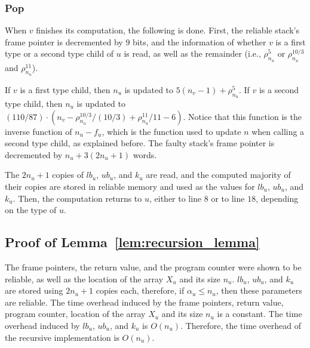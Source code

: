 \documentclass{llncs}
\begin{document}
\subsubsection{Pop}

When $v$ finishes its computation, the following is done. First, the reliable stack's frame pointer is decremented by $9$ bits, and the information of whether $v$ is a first type or a second type child of $u$ is read, as well as the remainder (i.e., $\rho^5_{n_u}$ or $\rho^{10/3}_{n_u}$ and $\rho^{11}_{n_u}$).

If $v$ is a first type child, then $n_u$ is updated to $5(n_v - 1) + \rho^5_{n_u}$. If $v$ is a second type child, then $n_u$ is updated to $(110/87) \cdot (n_v - \rho^{10/3}_{n_u}/(10/3) + \rho^{11}_{n_u} / 11 - 6)$. Notice that this function is the inverse function of $n_u - f_u$, which is the function used to update $n$ when calling a second type child, as explained before. The faulty stack's frame pointer is decremented by $n_u + 3(2n_u + 1)$ words.

The $2n_u + 1$ copies of $lb_u$, $ub_u$, and $k_u$ are read, and the computed majority of their copies are stored in reliable memory and used as the values for $lb_u$, $ub_u$, and $k_u$. Then, the computation returns to $u$, either to line $8$ or to line $18$, depending on the type of $u$.













\subsection{Proof of Lemma~\ref{lem:recursion_lemma}}

\begin{pf}
The frame pointers, the return value, and the program counter were shown to be reliable, as well as the location of the array $X_u$ and its size $n_u$. $lb_u$, $ub_u$, and $k_u$ are stored using $2n_u + 1$ copies each, therefore, if $\alpha_u \leq n_u$, then these parameters are reliable. The time overhead induced by the frame pointers, return value, program counter, location of the array $X_u$ and its size $n_u$ is a constant. The time overhead induced by $lb_u$, $ub_u$, and $k_u$ is $O(n_u)$. Therefore, the time overhead of the recursive implementation is $O(n_u)$.
\end{pf}
\end{document}
